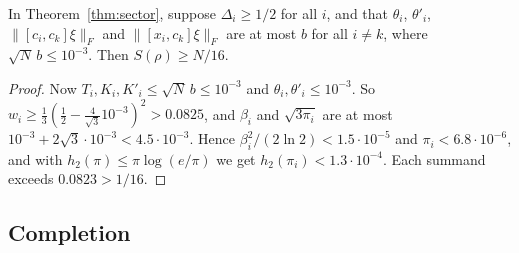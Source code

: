 \begin{corollary}\label{cor:sector}
In Theorem~\ref{thm:sector}, suppose $\Delta_i\ge1/2$ for all $i$, and that $\theta_i$, $\theta'_i$, $\|[c_i,c_k]\xi\|_F$ and $\|[x_i,c_k]\xi\|_F$ are at
most $b$ for all $i\ne k$, where $\sqrt N\,b\le10^{-3}$. Then $S(\rho)\ge N/16$.
\end{corollary}

\begin{proof}
Now $T_i,K_i,K'_i\le\sqrt N\,b\le10^{-3}$ and $\theta_i,\theta'_i\le10^{-3}$. So $w_i\ge\frac13(\frac12-\frac4{\sqrt3}10^{-3})^2>0.0825$, and $\beta_i$ and
$\sqrt{3\pi_i}$ are at most $10^{-3}+2\sqrt3\cdot10^{-3}<4.5\cdot10^{-3}$. Hence $\beta_i^2/(2\ln2)<1.5\cdot10^{-5}$ and $\pi_i<6.8\cdot10^{-6}$, and with
$h_2(\pi)\le\pi\log(e/\pi)$ we get $h_2(\pi_i)<1.3\cdot10^{-4}$. Each summand exceeds $0.0823>1/16$.
\end{proof}

\subsection{Completion}


